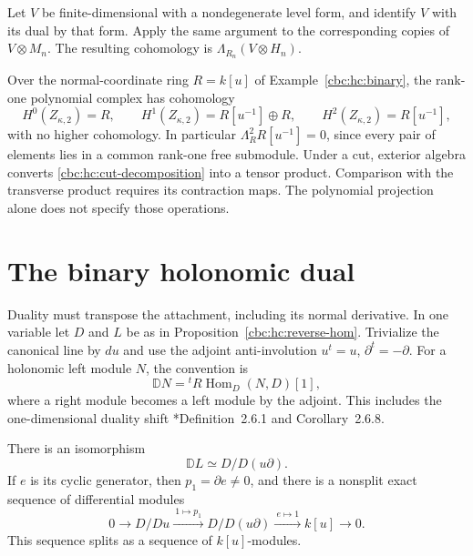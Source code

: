 Let $V$ be finite-dimensional with a nondegenerate level
form, and identify $V$ with its dual by that form.
Apply the same argument to the corresponding copies of
$V\otimes M_n$. The resulting cohomology is
$\Lambda_{R_n}(V\otimes H_n)$.

Over the normal-coordinate ring $R=k[u]$ of
Example~\ref{cbc:hc:binary}, the rank-one polynomial complex
has cohomology
\[
 H^0(Z_{\kappa,2})=R,\qquad
 H^1(Z_{\kappa,2})=R[u^{-1}]\oplus R,\qquad
 H^2(Z_{\kappa,2})=R[u^{-1}],
\]
with no higher cohomology. In particular
$\Lambda_R^2R[u^{-1}]=0$, since every pair of elements
lies in a common rank-one free submodule.
Under a cut, exterior algebra converts
\eqref{cbc:hc:cut-decomposition} into a tensor product.
Comparison with the transverse product requires its
contraction maps. The polynomial projection alone does
not specify those operations.

\section{The binary holonomic dual}
\label{cbc:hc:dual}

Duality must transpose the attachment, including its normal
derivative. In one variable let $D$ and $L$ be as in
Proposition~\ref{cbc:hc:reverse-hom}. Trivialize the canonical
line by $du$ and use the adjoint anti-involution
$u^t=u$, $\partial^t=-\partial$.
For a holonomic left module $N$, the convention is
\[
 \mathbb D N={}^{t}R\operatorname{Hom}_D(N,D)[1],
\]
where a right module becomes a left module by the adjoint.
This includes the one-dimensional duality shift
\cite{HottaTakeuchiTanisaki2008}*{Definition~2.6.1 and Corollary~2.6.8}.

\begin{proposition}\label{cbc:hc:binary-dual}
There is an isomorphism
\begin{equation}\label{cbc:hc:dual-module}
 \mathbb D L\simeq D/D(u\partial).
\end{equation}
If $e$ is its cyclic generator, then $p_1=\partial e\ne0$,
and there is a nonsplit exact sequence of differential modules
\begin{equation}\label{cbc:hc:dual-extension}
 0\longrightarrow D/Du\xrightarrow{\ 1\mapsto p_1\ }
 D/D(u\partial)\xrightarrow{\ e\mapsto1\ }k[u]
 \longrightarrow0.
\end{equation}
This sequence splits as a sequence of $k[u]$-modules.
\end{proposition}

